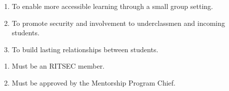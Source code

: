 

\begin{enumerate}
  \item To enable more accessible learning through a small group setting.
  \item To promote security and involvement to underclassmen and incoming
    students.
  \item To build lasting relationships between students.
\end{enumerate}


\begin{enumerate}
  \item Must be an RITSEC member.
  \item Must be approved by the Mentorship Program Chief.
\end{enumerate}